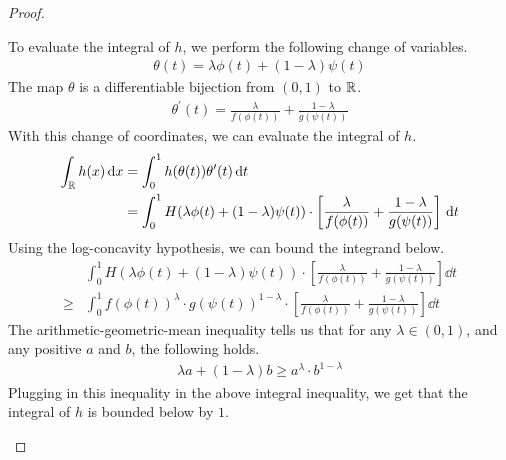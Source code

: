 \documentclass[11pt]{article}
\begin{document}
\begin{proof}
\begin{description}
    To evaluate the integral of $h$, we perform the following change of variables.
    \begin{align*}
      \theta(t) = \lambda \phi(t) + (1- \lambda)\psi(t)
    \end{align*}
    The map $\theta$ is a differentiable bijection from $(0,1)$ to $\mathbb{R}$.
    \begin{align*}
      \theta^{\prime}(t) = \frac{\lambda}{f(\phi(t))} + \frac{1-\lambda}{g(\psi(t))}
    \end{align*}
    With this change of coordinates, we can evaluate the integral of $h$.
    \begin{align*}
      \int_{\mathbb{R}} h(x) \mathrm{\,d} x &= \int_0^1 h(\theta(t)) \theta^{\prime}(t) \mathrm{\,d} t \\
                           &= \int_0^1 H(\lambda \phi(t) + (1- \lambda)\psi(t))
                             \cdot \left[ \frac{\lambda}{f(\phi(t))} + \frac{1-\lambda}{g(\psi(t))} \right] \mathrm{\,d} t
    \end{align*}
    Using the log-concavity hypothesis, we can bound the integrand below.
    \begin{align*}
      &\int_0^1 H(\lambda \phi(t) + (1- \lambda)\psi(t))
      \cdot \left[ \frac{\lambda}{f(\phi(t))} + \frac{1-\lambda}{g(\psi(t))} \right] \dd t \\
      \geq &\int_{0}^1 f(\phi(t))^{\lambda} \cdot g(\psi(t))^{1-\lambda}
      \cdot \left[ \frac{\lambda}{f(\phi(t))} + \frac{1-\lambda}{g(\psi(t))} \right] \dd t
    \end{align*}
    The arithmetic-geometric-mean inequality tells us that for any $\lambda \in (0,1)$, and any positive $a$ and $b$, the following holds.
    \begin{align*}
      \lambda a + (1-\lambda)b \geq a^{\lambda} \cdot b^{1-\lambda}
    \end{align*}
    Plugging in this inequality in the above integral inequality, we get that the integral of $h$ is bounded below by $1$.


\end{description}
\end{proof}
\end{document}
